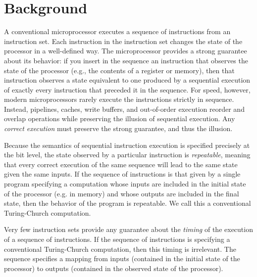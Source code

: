 \section{Background}


A conventional microprocessor executes a sequence of instructions from
an instruction set. Each instruction in the instruction set changes
the state of the processor in a well-defined way.
The microprocessor provides a strong guarantee about its
behavior: if you insert in the sequence an instruction that observes the state of the
processor (e.g., the contents of a register or memory), then that
instruction observes a state equivalent to one produced by a
sequential execution of exactly every instruction that preceded it in
the sequence.
For speed, however, modern microprocessors rarely execute the instructions
strictly in sequence. Instead, pipelines, caches, write buffers, and
out-of-order execution reorder and overlap operations while preserving
the illusion of sequential execution.  Any \emph{correct execution}
must preserve the strong guarantee, and thus the illusion.

Because the semantics of sequential instruction execution is
specified precisely at the bit level, the state observed by a
particular instruction is \emph{repeatable}, meaning that every
correct execution of the same sequence
will lead to the same state given the same inputs.
If the sequence of instructions is that given by a single program
specifying a computation whose inputs are included in
the  initial state of the processor (e.g. in memory) and whose
outputs are included in the final state, then the behavior
of the program is repeatable. We call this
a conventional Turing-Church computation.

Very few instruction sets provide any guarantee
about the \emph{timing} of the execution of a sequence of instructions.
If the sequence of instructions is specifying a conventional
Turing-Church computation, then this timing is irrelevant.
The sequence specifies a mapping from inputs (contained in the
initial state of the processor) to outputs (contained in the observed state
of the processor).


